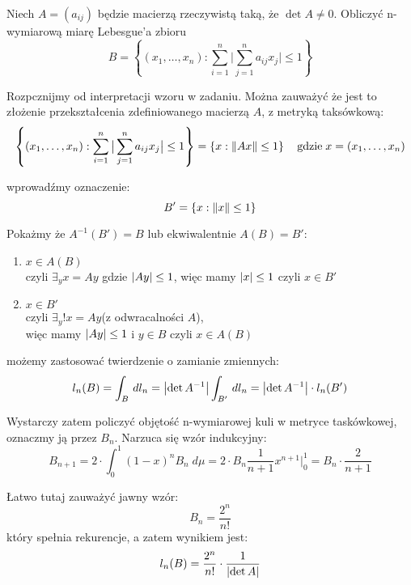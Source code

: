 \documentclass[11pt]{scrartcl}
\begin{document}
    \newpage

    \begin{zadanie*}
        Niech $A = (a_{ij})$ będzie macierzą rzeczywistą taką, że $\det A \not = 0$. Obliczyć n-wymiarową miarę Lebesgue'a zbioru
        \[
            B = \left\{ (x_1, \dots, x_n) : \sum_{i=1}^{n} \big| \sum_{j=1}^{n} a_{ij} x_j \big| \leq 1 \right\}
        \]
    \end{zadanie*}

    Rozpcznijmy od interpretacji wzoru w zadaniu. Można zauważyć że jest to złożenie przekształcenia zdefiniowanego macierzą $A$, z metryką taksówkową:
    \[
        \left\{ (x_1, \dots, x_n) : \sum_{i=1}^{n} \big| \sum_{j=1}^{n} a_{ij} x_j \big| \leq 1 \right\} 
        = \left \{ x : \left\lVert Ax \right\rVert \leq 1 \right \} \quad 
        \mathrm{gdzie} \; x = (x_1, \dots, x_n)
    \]

    wprowadźmy oznaczenie:
    \[
        B' = \left \{ x : \left\lVert x \right\rVert \leq 1 \right \}
    \]

    Pokażmy że $A^{-1} \left ( B' \right ) = B$ lub ekwiwalentnie $A(B) = B'$:
    \begin{enumerate}
        \item $x \in A(B)$ \\ czyli $\exists_y x = Ay$ gdzie $\left\lvert Ay \right\rvert \leq 1$, więc mamy $\left\lvert x \right\rvert \leq 1$ czyli $x \in B'$
        \item $x \in B'$ \\ czyli $\exists_y! x = Ay$(z odwracalności $A$), \\
            więc mamy $\left\lvert Ay \right\rvert \leq 1$ i $y \in B$ czyli $x \in A(B)$
    \end{enumerate}


    możemy zastosować twierdzenie o zamianie zmiennych:
    \[
        l_n (B) = \int_B \, dl_n = \left\lvert \det A^{-1} \right\rvert \int_{B'} \, dl_n = \left\lvert \det A^{-1} \right\rvert \cdot l_n (B')  
    \]

    Wystarczy zatem policzyć objętość n-wymiarowej kuli w metryce taskówkowej, oznaczmy ją przez $B_n$. Narzuca się wzór indukcyjny:
    \[
        B_{n+1} = 2 \cdot \int_0^1 (1-x)^n B_n \; d \mu
        = 2 \cdot B_n \frac{1}{n+1} x^{n+1} \Big|_0^1
        = B_n \cdot \frac{2}{n + 1}
    \]

    Łatwo tutaj zauważyć jawny wzór:
    \[
        B_n = \frac{2^n}{n!}
    \]
    który spełnia rekurencje, a zatem wynikiem jest:
    \[
        l_n (B) = \frac{2^n}{n!} \cdot \frac{1}{\left\lvert \det A \right\rvert }
    \]
    
    \newpage
\end{document}
